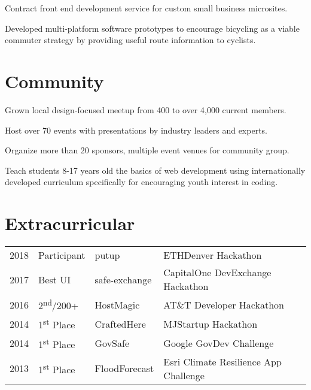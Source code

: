 \documentclass[]{deedy-resume-openfont}
\begin{document}
\begin{minipage}[t]{0.66\textwidth}
\begin{tightemize}
\item Contract front end development service for custom small business  microsites. \end{tightemize}
\sectionsep

\begin{tightemize}
\item Developed multi-platform software prototypes to encourage bicycling as a viable commuter strategy by providing useful route information to cyclists. \end{tightemize}
\sectionsep


\section{Community}
\begin{tightemize}
\item Grown local design-focused meetup from 400 to over 4,000 current members.\item Host over 70 events with presentations by industry leaders  and experts.\item Organize more than 20 sponsors, multiple event venues for community group.
\end{tightemize}
\sectionsep

Teach students 8-17 years old the basics of web development using internationally developed curriculum specifically for encouraging youth interest in coding.
\sectionsep


\section{Extracurricular}
\begin{tabular}{rlll}
2018 & Participant & putup  & ETHDenver Hackathon \\
2017 & Best UI & safe-exchange  & CapitalOne DevExchange Hackathon\\
2016 & 2\textsuperscript{nd}/200+ & HostMagic  & AT\&T Developer Hackathon \\
2014 & 1\textsuperscript{st} Place & CraftedHere  & MJStartup Hackathon \\
2014 & 1\textsuperscript{st} Place & GovSafe  & Google GovDev Challenge \\
2013 & 1\textsuperscript{st} Place & FloodForecast & Esri Climate Resilience App Challenge\\
\end{tabular}
\sectionsep

\end{minipage}
\end{document}
